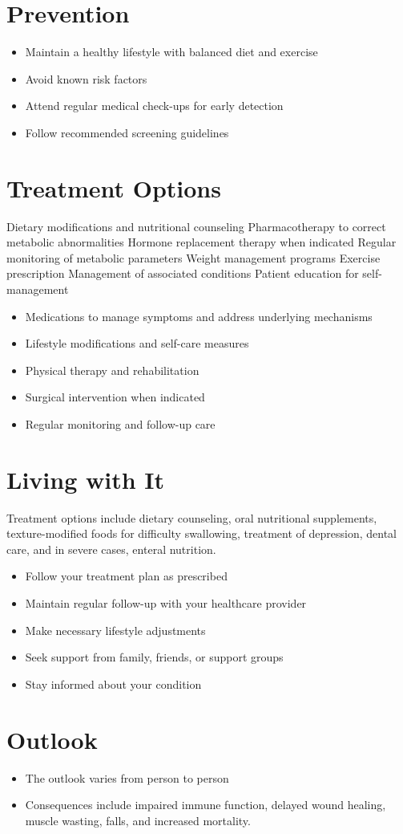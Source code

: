 \section{Prevention}
\begin{itemize}[noitemsep]
  \item Maintain a healthy lifestyle with balanced diet and exercise
  \item Avoid known risk factors
  \item Attend regular medical check-ups for early detection
  \item Follow recommended screening guidelines
\end{itemize}
\section{Treatment Options}
Dietary modifications and nutritional counseling Pharmacotherapy to correct metabolic abnormalities Hormone replacement therapy when indicated Regular monitoring of metabolic parameters Weight management programs Exercise prescription Management of associated conditions Patient education for self-management

\begin{itemize}[noitemsep]
  \item Medications to manage symptoms and address underlying mechanisms
  \item Lifestyle modifications and self-care measures
  \item Physical therapy and rehabilitation
  \item Surgical intervention when indicated
  \item Regular monitoring and follow-up care
\end{itemize}
\section{Living with It}
Treatment options include dietary counseling, oral nutritional supplements, texture-modified foods for difficulty swallowing, treatment of depression, dental care, and in severe cases, enteral nutrition.

\begin{itemize}[noitemsep]
  \item Follow your treatment plan as prescribed
  \item Maintain regular follow-up with your healthcare provider
  \item Make necessary lifestyle adjustments
  \item Seek support from family, friends, or support groups
  \item Stay informed about your condition
\end{itemize}
\section{Outlook}
\begin{itemize}[noitemsep]
  \item The outlook varies from person to person
  \item Consequences include impaired immune function, delayed wound healing, muscle wasting, falls, and increased mortality.
\end{itemize}
